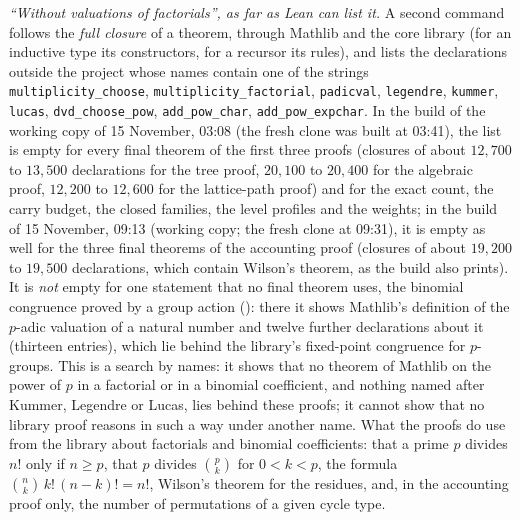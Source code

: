 \documentclass[11pt]{article}
\theoremstyle{definition}
\theoremstyle{remark}
\numberwithin{equation}{section}
\numberwithin{figure}{section}
\begin{document}
\emph{``Without valuations of factorials'', as far as Lean can list it.} A second command follows the
\emph{full closure} of a theorem, through Mathlib and the core library (for an inductive type its
constructors, for a recursor its rules), and lists the declarations outside the project whose names contain
one of the strings \texttt{multiplicity\_choose}, \texttt{multiplicity\_factorial}, \texttt{padicval},
\texttt{legendre}, \texttt{kummer}, \texttt{lucas}, \texttt{dvd\_choose\_pow}, \texttt{add\_pow\_char},
\texttt{add\_pow\_expchar}. In the build of the working copy of 15 November, 03:08 (the fresh clone was built at 03:41), the list is empty for every final theorem of
the first three proofs (closures of about $12{,}700$ to $13{,}500$ declarations for the tree proof, $20{,}100$ to
$20{,}400$ for the algebraic proof, $12{,}200$ to $12{,}600$ for the lattice-path proof) and for the exact
count, the carry budget, the closed families, the level profiles and the weights; in the build of
15 November, 09:13 (working copy; the fresh clone at 09:31), it is empty as well for the three final theorems of the accounting proof (closures of
about $19{,}200$ to $19{,}500$ declarations, which contain Wilson's theorem, as the build also prints). It is
\emph{not} empty for one statement that no final theorem uses, the binomial congruence proved by a group
action (): there it shows Mathlib's definition of the $p$-adic valuation
of a natural number and twelve further declarations about it (thirteen entries), which lie behind the library's fixed-point congruence
for $p$-groups. This is a search by names:
it shows that no theorem of Mathlib on the power of $p$ in a factorial or in a binomial coefficient, and
nothing named after Kummer, Legendre or Lucas, lies behind these proofs; it cannot show that no library proof
reasons in such a way under another name. What the proofs do use from the library about factorials and
binomial coefficients: that a prime $p$ divides $n!$ only if $n\ge p$, that $p$ divides $\binom pk$ for
$0<k<p$, the formula $\binom nk\,k!\,(n-k)!=n!$, Wilson's theorem for the residues, and, in the accounting
proof only, the number of permutations of a given cycle type.


\end{document}
